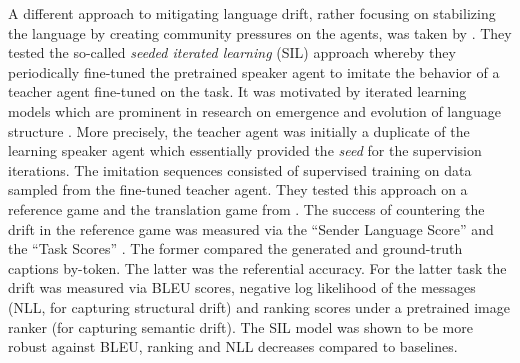 A different approach to mitigating language drift, rather focusing on stabilizing the language by creating community pressures on the agents, was taken by \cite{lu2020countering}. They tested the so-called \textit{seeded iterated learning} (SIL) approach whereby they periodically fine-tuned the pretrained speaker agent to imitate the behavior of a teacher agent fine-tuned on the task. It was motivated by iterated learning models which are prominent in research on emergence and evolution of language structure \parencite{kirby2014iterated}. More precisely, the teacher agent was initially a duplicate of the learning speaker agent which essentially provided the \textit{seed} for the supervision iterations. The imitation sequences consisted of supervised training on data sampled from the fine-tuned teacher agent. They tested this approach on a reference game and the translation game from \cite{lee2019countering}. The success of countering the drift in the reference game was measured via the ``Sender Language Score'' and the ``Task Scores'' \parencite[][p.~5]{lu2020countering}. The former compared the generated and ground-truth captions by-token. The latter was the referential accuracy. %
For the latter task the drift was measured via BLEU scores, negative log likelihood of the messages (NLL, for capturing structural drift) and ranking scores under a pretrained image ranker (for capturing semantic drift). The SIL model was shown to be more robust against BLEU, ranking and NLL decreases compared to baselines.

